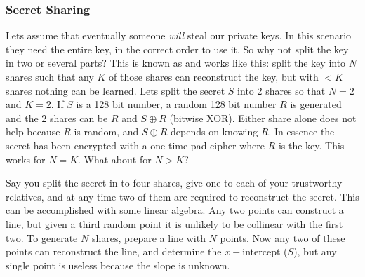 \subsubsection*{Secret Sharing}
Lets assume that eventually someone \textit{will} steal our private keys. In this scenario they need the entire key, in the correct order to use it. So why not split the key in two or several parts? This is known as  and works like this: split the key into $N$ shares such that any $K$ of those shares can reconstruct the key, but with $<K$ shares nothing can be learned. Lets split the secret $S$  into 2 shares so that $N=2$ and $K=2$. If $S$ is a 128 bit number, a random 128 bit number $R$ is generated and the 2 shares can be $R$ and $S\oplus R$ (bitwise XOR). Either share alone does not help because $R$ is random, and $S\oplus R$ depends on knowing $R$. In essence the secret has been encrypted with a one-time pad cipher where $R$ is the key. This works for $N=K$. What about for $N>K$?

Say you split the secret in to four shares, give one to each of your trustworthy relatives, and at any time two of them are required to reconstruct the secret. This can be accomplished with some linear algebra. Any two points can construct a line, but given a third random point it is unlikely to be collinear with the first two. To generate $N$ shares, prepare a line with $N$ points. Now any two of these points can reconstruct the line, and determine the $x-$intercept ($S$), but any single point is useless because the slope is unknown. 

\begin{center}
\end{center}

